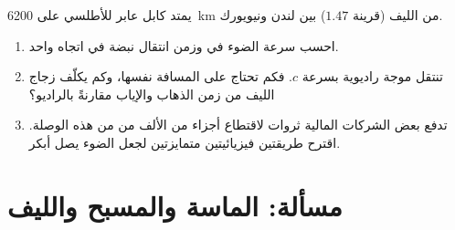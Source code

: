 \begin{exercise}[$\star\star\star$]\label{exo:g10:refraction:15}
يمتد كابل عابر للأطلسي على \qty{6200}{km} من الليف (قرينة  $1.47$)
بين لندن ونيويورك.
\begin{enumerate}
  \item احسب سرعة الضوء في  وزمن انتقال نبضة في
        اتجاه واحد.
  \item تنتقل موجة راديوية بسرعة $c$. فكم تحتاج على
        المسافة نفسها، وكم يكلّف زجاج الليف من زمن الذهاب والإياب مقارنةً بالراديو؟
  \item تدفع بعض الشركات المالية ثروات لاقتطاع أجزاء من الألف من  من هذه
        الوصلة. اقترح طريقتين فيزيائيتين متمايزتين لجعل الضوء
        يصل أبكر.
\end{enumerate}
\end{exercise}

\section{مسألة: الماسة والمسبح والليف}

